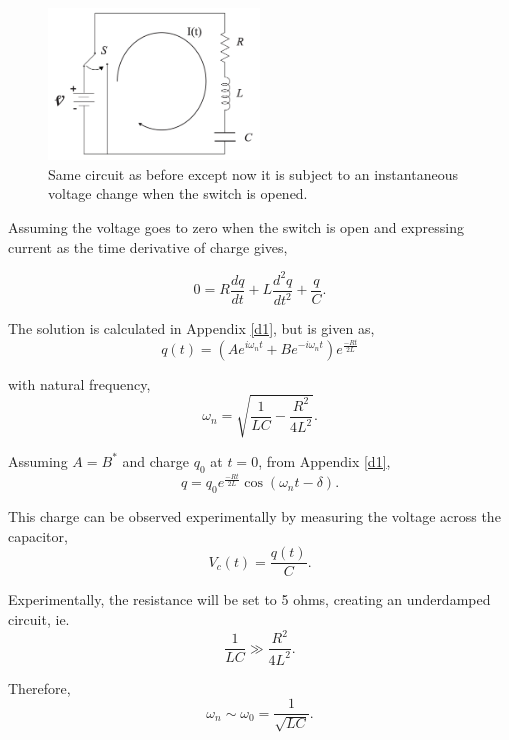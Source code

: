 \documentclass{article}
\begin{document}
\begin{figure}[H]
    \centering
    \includegraphics[width=0.5\textwidth]{circuit1.png}
    \caption{Same circuit as before except now it is subject to an 
    instantaneous voltage change when the switch is opened.}
    \label{fig:circuit2}
\end{figure}

Assuming the voltage goes to zero when the switch is open and expressing 
current as the time derivative of charge gives,

\begin{equation}
    0 = R\frac{dq}{dt}+L\frac{d^2q}{dt^2}+\frac{q}{C}.
\end{equation}

The solution is calculated in Appendix \ref{d1}, but is given as,
\begin{equation}
    q(t) = (Ae^{i\omega_nt}+Be^{-i\omega_nt})e^{\frac{-Rt}{2L}}
\end{equation}

with natural frequency,
\begin{equation}
    \omega_n = \sqrt{\frac{1}{LC}-\frac{R^2}{4L^2}}.
\end{equation}

Assuming $A=B^{*}$ and charge $q_0$ at $t=0$, from Appendix \ref{d1},
\begin{equation}
    q = q_0e^{\frac{-Rt}{2L}}\cos{\left(\omega_nt-\delta\right)}.
\end{equation}

This charge can be observed experimentally by measuring the voltage
across the capacitor,
\begin{equation}
    V_c(t) = \frac{q(t)}{C}.
\end{equation}

Experimentally, the resistance will be set to 5 ohms, creating an
underdamped circuit, ie.
\begin{equation}
    \frac{1}{LC} \gg \frac{R^2}{4L^2}.
\end{equation}

Therefore,
\begin{equation}
    \omega_n \sim \omega_0 = \frac{1}{\sqrt{LC}}.
\end{equation}
\end{document}
